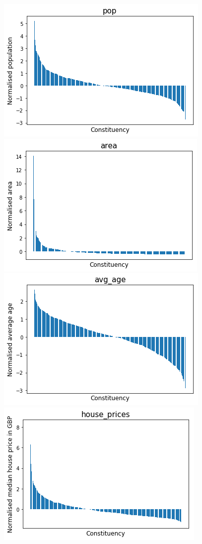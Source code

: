 \documentclass[a4paper, 11pt]{article}
\begin{document}
\begin{figure}
\includegraphics[scale=.43]{../gfx/pop.png}
\includegraphics[scale=.43]{../gfx/area.png}\\
\includegraphics[scale=.43]{../gfx/avg_age.png}
\includegraphics[scale=.43]{../gfx/house_price.png}\\

\end{figure}
\end{document}

